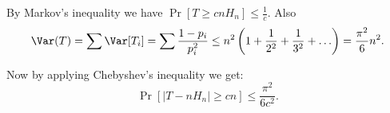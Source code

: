 By Markov's inequality we have $\Pr[T \geq c n H_n] \leq \frac{1}{c}$. Also $$\Var(T) = \sum \Var[T_i] = \sum \frac{1 - p_i}{p_i^2} \leq n^2 \left( 1 + \frac{1}{2^2} + \frac{1}{3^2} + \ldots \right) = \frac{\pi^2}{6}  n^2.$$

Now by applying Chebyshev's inequality we get:
$$\Pr[\vert T - n H_n\vert \geq c n] \leq \frac{\pi^2}{6c^2}.$$
